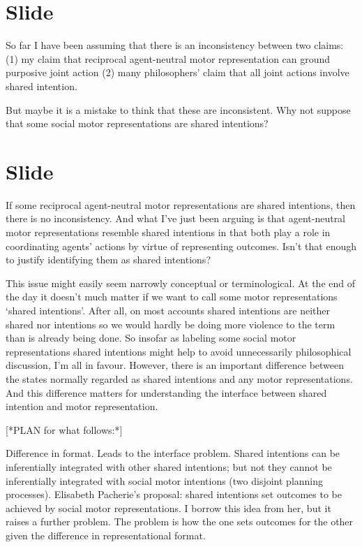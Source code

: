\documentclass[12pt,\papersize]{extarticle}
\begin{document}
\section{Slide}
So far I have been assuming that there is an inconsistency between two claims:
(1) my claim that reciprocal  agent-neutral motor representation can ground purposive joint action
(2) many philosophers’ claim that all joint actions involve shared intention.

But maybe it is a mistake to think that these are inconsistent.
Why not suppose that some social motor representations are  shared intentions?




\section{Slide}
If some reciprocal agent-neutral motor representations are shared intentions, then there is no inconsistency.
And what I’ve just been arguing is that agent-neutral motor representations resemble shared intentions in that both play a role in coordinating agents’ actions by virtue of representing outcomes.  Isn’t that enough to justify identifying them as shared intentions?

This issue might easily seem narrowly conceptual or terminological.  
At the end of the day it doesn’t much matter if we want to call some motor representations ‘shared intentions’.  
After all, on most accounts shared intentions are neither shared nor intentions so we would hardly be doing more violence to the term than is already being done.  
So insofar as labeling some social motor representations shared intentions might help to avoid unnecessarily philosophical discussion, I’m all in favour.
However, there is an important difference between the states normally regarded as  shared intentions and any motor representations.
And this difference matters for understanding the interface between shared intention and motor representation.


[*PLAN for what follows:*]

Difference in format.
Leads to the interface problem.  
Shared intentions can be inferentially integrated with other shared intentions; but not they cannot be inferentially integrated with social motor intentions (two disjoint planning processes).  
Elisabeth Pacherie’s proposal: shared intentions set outcomes to be achieved by social motor representations.  
I borrow this idea from her, but it raises a further problem.
The problem is how the one sets outcomes for the other given the difference in representational format.
\end{document}
